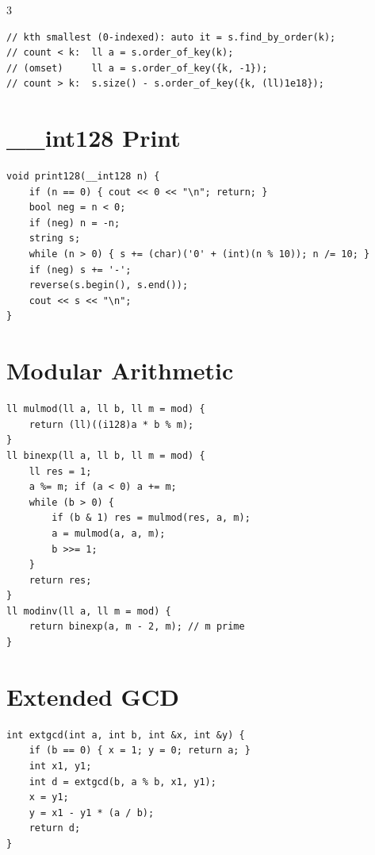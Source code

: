 \documentclass[10pt]{article}
\begin{document}
\begin{multicols*}{3}
\begin{lstlisting}
// kth smallest (0-indexed): auto it = s.find_by_order(k);
// count < k:  ll a = s.order_of_key(k);
// (omset)     ll a = s.order_of_key({k, -1});
// count > k:  s.size() - s.order_of_key({k, (ll)1e18});
\end{lstlisting}

\section{\_\_int128 Print}
\begin{lstlisting}
void print128(__int128 n) {
    if (n == 0) { cout << 0 << "\n"; return; }
    bool neg = n < 0;
    if (neg) n = -n;
    string s;
    while (n > 0) { s += (char)('0' + (int)(n % 10)); n /= 10; }
    if (neg) s += '-';
    reverse(s.begin(), s.end());
    cout << s << "\n";
}
\end{lstlisting}

\section{Modular Arithmetic}
\begin{lstlisting}
ll mulmod(ll a, ll b, ll m = mod) {
    return (ll)((i128)a * b % m);
}
ll binexp(ll a, ll b, ll m = mod) {
    ll res = 1;
    a %= m; if (a < 0) a += m;
    while (b > 0) {
        if (b & 1) res = mulmod(res, a, m);
        a = mulmod(a, a, m);
        b >>= 1;
    }
    return res;
}
ll modinv(ll a, ll m = mod) {
    return binexp(a, m - 2, m); // m prime
}
\end{lstlisting}

\section{Extended GCD}
\begin{lstlisting}
int extgcd(int a, int b, int &x, int &y) {
    if (b == 0) { x = 1; y = 0; return a; }
    int x1, y1;
    int d = extgcd(b, a % b, x1, y1);
    x = y1;
    y = x1 - y1 * (a / b);
    return d;
}
\end{lstlisting}


\end{multicols*}
\end{document}

